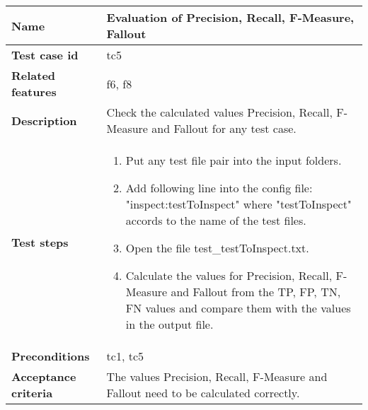 	\begin{tabular}{ | p{3.5cm} | p{12cm} |}
	\hline
	\textbf{Name} 					& Evaluation of Precision, Recall, F-Measure, Fallout 		\\ 	\hline
	\textbf{Test case id} 			& tc5 						\\ 	\hline
	\textbf{Related features}		& f6, f8						\\ 	\hline
	\textbf{Description} 			& Check the calculated values  Precision, Recall, F-Measure and Fallout for any test case.	\\ 	\hline
	\textbf{Test steps} 			& 	\begin{enumerate}
											\item{Put any test file pair into the input folders.}
											\item{Add following line into the config file: "inspect:testToInspect" where "testToInspect" accords to the name of the test files. }
											\item{Open the file test\_testToInspect.txt.}
											\item{Calculate the values for Precision, Recall, F-Measure and  Fallout from the TP, FP, TN, FN values and compare them with the values in the output file.}
										\end{enumerate}
																\\ 	\hline
	\textbf{Preconditions} 			& tc1, tc5							\\ 	\hline
	\textbf{Acceptance criteria} 	& The values Precision, Recall, F-Measure and Fallout need to be calculated correctly.	\\ 	\hline
	\end{tabular} \\




